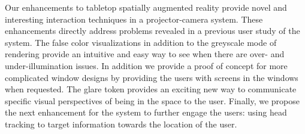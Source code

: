 \documentclass[10pt,twocolumn,letterpaper]{article}
\begin{document}
Our enhancements to tabletop spatially augmented reality provide novel
and interesting interaction techniques in a projector-camera system.
These enhancements directly address problems revealed in a previous
user study of the system.  The false color visualizations in addition
to the greyscale mode of rendering provide an intuitive and easy way
to see when there are over- and under-illumination issues.  In addition
we provide a proof of concept for more complicated window designs by
providing the users with screens in the windows when requested.  The
glare token provides an exciting new way to communicate specific visual
perspectives of being in the space to the user.  Finally, we propose
the next enhancement for the system to further engage the users: using
head tracking to target information towards the location of the user.

\end{document}
